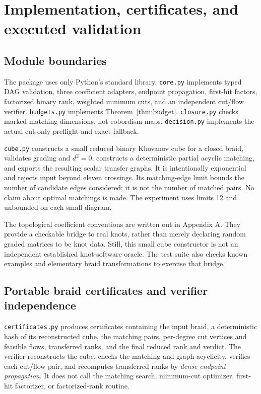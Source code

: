 \documentclass[11pt,letterpaper]{article}
\theoremstyle{definition}\newtheorem{definition}[theorem]{Definition}
\theoremstyle{remark}\newtheorem{remark}[theorem]{Remark}
\newcommand{\code}[1]{\texttt{#1}}
\begin{document}
\section{Implementation, certificates, and executed validation}
\subsection{Module boundaries}
The package uses only Python's standard library. \code{core.py} implements
typed DAG validation, three coefficient adapters, endpoint propagation,
first-hit factors, factorized binary rank, weighted minimum cuts, and an
independent cut/flow verifier. \code{budgets.py} implements
Theorem~\ref{thm:budget}. \code{closure.py} checks marked matching dimensions,
not cobordism maps. \code{decision.py} implements the actual cut-only
preflight and exact fallback.

\code{cube.py} constructs a small reduced binary Khovanov cube for a closed
braid, validates grading and $d^2=0$, constructs a deterministic partial
acyclic matching, and exports the resulting scalar transfer graphs.
It is intentionally exponential and rejects input beyond eleven crossings.
Its matching-edge limit bounds the number of candidate edges considered;
it is not the number of matched pairs. No claim about optimal matchings is
made. The experiment uses limits 12 and unbounded on each small diagram.

The topological coefficient conventions are written out in Appendix A.
They provide a checkable bridge to real knots, rather than merely declaring
random graded matrices to be knot data. Still, this small cube constructor
is not an independent established knot-software oracle. The test suite
also checks known examples and elementary braid transformations to exercise
that bridge.

\subsection{Portable braid certificates and verifier independence}
\code{certificates.py} produces certificates containing the input braid,
a deterministic hash of its reconstructed cube, the matching pairs,
per-degree cut vertices and feasible flows, transferred ranks, and the final
reduced rank and verdict. The verifier reconstructs the cube, checks the
matching and graph acyclicity, verifies each cut/flow pair, and recomputes
transferred ranks by \emph{dense endpoint propagation}. It does not call
the matching search, minimum-cut optimizer, first-hit factorizer, or
factorized-rank routine.
\end{document}
